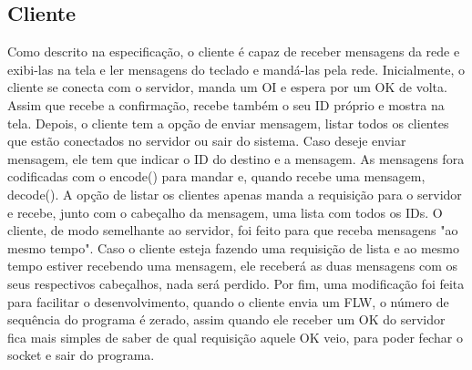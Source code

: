 \documentclass[10pt]{article}
\begin{document}
	\subsection{Cliente}
	Como descrito na especificação, o cliente é capaz de receber mensagens da rede e exibi-las na tela e ler mensagens do teclado e mandá-las pela rede.
	\newline Inicialmente, o cliente se conecta com o servidor, manda um OI e espera por um OK de volta. Assim que recebe a confirmação, recebe também o seu ID próprio e mostra na tela. 
	\newline Depois, o cliente tem a opção de enviar mensagem, listar todos os clientes que estão conectados no servidor ou sair do sistema. Caso deseje enviar mensagem, ele tem que indicar o ID do destino e a mensagem. As mensagens fora codificadas com o encode() para mandar e, quando recebe uma mensagem, decode().
	\newline A opção de listar os clientes apenas manda a requisição para o servidor e recebe, junto com o cabeçalho da mensagem, uma lista com todos os IDs.
	\newline O cliente, de modo semelhante ao servidor, foi feito para que receba mensagens "ao mesmo tempo". Caso o cliente esteja fazendo uma requisição de lista e ao mesmo tempo estiver recebendo uma mensagem, ele receberá as duas mensagens com os seus respectivos cabeçalhos, nada será perdido. 
	\newline Por fim, uma modificação foi feita para facilitar o desenvolvimento, quando o cliente envia um FLW, o número de sequência do programa é zerado, assim quando ele receber um OK do servidor fica mais simples de saber de qual requisição aquele OK veio, para poder fechar o socket e sair do programa.
\end{document}
